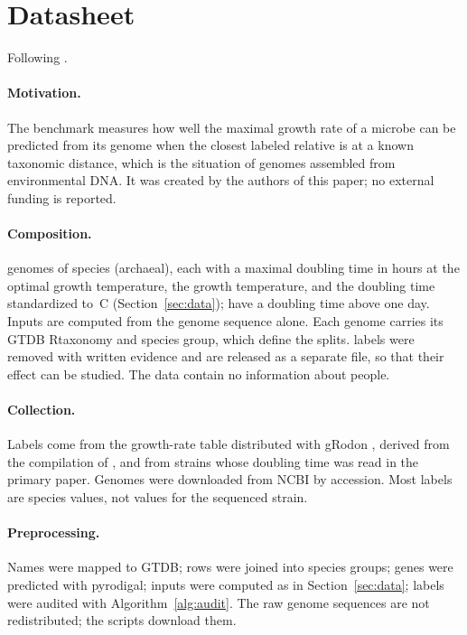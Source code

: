 \section{Datasheet}\label{app:datasheet}
Following \citet{gebru2021}.

\paragraph{Motivation.} The benchmark measures how well the maximal growth rate of a microbe can be predicted from its
genome when the closest labeled relative is at a known taxonomic distance, which is the situation of genomes assembled
from environmental DNA. It was created by the authors of this paper; no external funding is reported.

\paragraph{Composition.} \NGenomes genomes of \NSpecies species (\NArchaea archaeal), each with a maximal doubling time in
hours at the optimal growth temperature, the growth temperature, and the doubling time standardized to \TRefC\,\textdegree C
(Section~\ref{sec:data}); \NSlow have a doubling time above one day. Inputs are computed from the genome sequence alone.
Each genome carries its GTDB R\GTDBRelease taxonomy and species group, which define the splits. \NExcluded labels were
removed with written evidence and are released as a separate file, so that their effect can be studied. The data contain
no information about people.

\paragraph{Collection.} Labels come from the growth-rate table distributed with gRodon \citep{weissman2021}, derived from
the compilation of \citet{madin2020}, and from \NLiteratureWord strains whose doubling time was read in the primary
paper. Genomes were downloaded from NCBI by accession. Most labels are species values, not values for the sequenced strain.

\paragraph{Preprocessing.} Names were mapped to GTDB; rows were joined into species groups; genes were predicted with
pyrodigal; inputs were computed as in Section~\ref{sec:data}; labels were audited with Algorithm~\ref{alg:audit}. The raw
genome sequences are not redistributed; the scripts download them.

